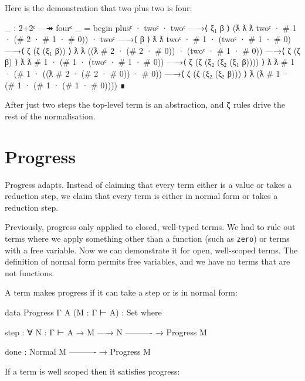 Here is the demonstration that two plus two is four:

\begin{fence}
\begin{code}
_ : 2+2ᶜ —↠ fourᶜ
_ =
  begin
    plusᶜ · twoᶜ · twoᶜ
  —→⟨ ξ₁ β ⟩
    (ƛ ƛ ƛ twoᶜ · # 1 · (# 2 · # 1 · # 0)) · twoᶜ
  —→⟨ β ⟩
    ƛ ƛ twoᶜ · # 1 · (twoᶜ · # 1 · # 0)
  —→⟨ ζ (ζ (ξ₁ β)) ⟩
    ƛ ƛ ((ƛ # 2 · (# 2 · # 0)) · (twoᶜ · # 1 · # 0))
  —→⟨ ζ (ζ β) ⟩
    ƛ ƛ # 1 · (# 1 · (twoᶜ · # 1 · # 0))
  —→⟨ ζ (ζ (ξ₂ (ξ₂ (ξ₁ β)))) ⟩
    ƛ ƛ # 1 · (# 1 · ((ƛ # 2 · (# 2 · # 0)) · # 0))
  —→⟨ ζ (ζ (ξ₂ (ξ₂ β))) ⟩
   ƛ (ƛ # 1 · (# 1 · (# 1 · (# 1 · # 0))))
  ∎
\end{code}
\end{fence}

After just two steps the top-level term is an abstraction, and
\texttt{ζ} rules drive the rest of the normalisation.

\hypertarget{progress}{%
\section{Progress}\label{progress}}

Progress adapts. Instead of claiming that every term either is a value
or takes a reduction step, we claim that every term is either in normal
form or takes a reduction step.

Previously, progress only applied to closed, well-typed terms. We had to
rule out terms where we apply something other than a function (such as
\texttt{\textasciigrave{}zero}) or terms with a free variable. Now we
can demonstrate it for open, well-scoped terms. The definition of normal
form permits free variables, and we have no terms that are not
functions.

A term makes progress if it can take a step or is in normal form:

\begin{fence}
\begin{code}
data Progress {Γ A} (M : Γ ⊢ A) : Set where

  step : ∀ {N : Γ ⊢ A}
    → M —→ N
      ----------
    → Progress M

  done :
      Normal M
      ----------
    → Progress M
\end{code}
\end{fence}

If a term is well scoped then it satisfies progress:


